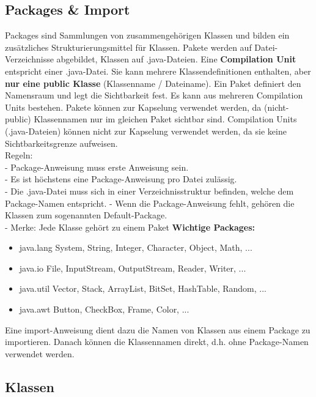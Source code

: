 \subsection{Packages \& Import}
Packages sind Sammlungen von zusammengehörigen Klassen und bilden ein zusätzliches Strukturierungsmittel für Klassen. Pakete werden auf Datei-Verzeichnisse abgebildet, Klassen auf .java-Dateien. Eine \textbf{Compilation Unit} entspricht einer .java-Datei. Sie kann mehrere Klassendefinitionen enthalten, aber \textbf{nur eine public Klasse} (Klassenname / Dateiname). Ein Paket definiert den Namensraum und legt die Sichtbarkeit fest. Es kann aus mehreren Compilation Units bestehen. Pakete können zur Kapselung verwendet werden, da (nicht-public) Klassennamen nur im gleichen Paket sichtbar sind. Compilation Units (.java-Dateien) können nicht zur Kapselung verwendet werden, da sie keine Sichtbarkeitsgrenze aufweisen. \\
Regeln: \\
- Package-Anweisung muss erste Anweisung sein. \\
- Es ist höchstens eine Package-Anweisung pro Datei zulässig. \\
- Die .java-Datei muss sich in einer Verzeichnisstruktur befinden, 
welche dem Package-Namen entspricht. 
- Wenn die Package-Anweisung fehlt, gehören die Klassen zum 
sogenannten Default-Package. \\
-  Merke: Jede Klasse gehört zu einem Paket
\newline
\newline
\textbf{Wichtige Packages:}
\begin{itemize}
	\item java.lang System, String, Integer, Character, Object, Math, ...
	\item java.io File, InputStream, OutputStream, Reader, Writer, ...
	\item java.util Vector, Stack, ArrayList, BitSet, HashTable, Random, ...
	\item java.awt Button, CheckBox, Frame, Color, ... 
\end{itemize}
Eine import-Anweisung dient dazu die Namen von Klassen aus einem Package zu importieren. Danach können die Klassennamen direkt, d.h. ohne Package-Namen verwendet werden. \\


\subsection{Klassen}

